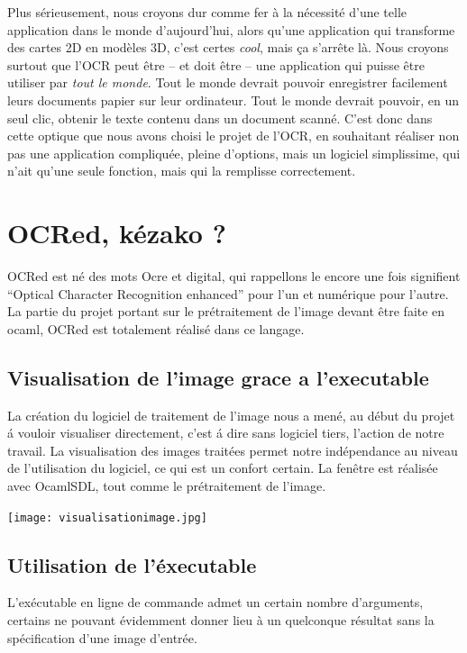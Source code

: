 \documentclass[a4paper,12pt]{report}
\begin{document}
Plus sérieusement, nous croyons dur comme fer à la nécessité d’une telle application dans le monde d’aujourd’hui, alors qu’une application qui transforme des cartes 2D en modèles 3D, c’est certes \emph{cool}, mais ça s’arrête là. Nous croyons surtout que l’OCR peut être – et doit être – une application qui puisse être utiliser par \emph{tout le monde}. Tout le monde devrait pouvoir enregistrer facilement leurs documents papier sur leur ordinateur. Tout le monde devrait pouvoir, en un seul clic, obtenir le texte contenu dans un document scanné. C’est donc dans cette optique que nous avons choisi le projet de l’OCR, en souhaitant réaliser non pas une application compliquée, pleine d’options, mais un logiciel simplissime, qui n’ait qu’une seule fonction, mais qui la remplisse correctement.

\chapter{ OCRed, k\'ezako ? }
 OCRed est n\'e des mots Ocre et digital, qui rappellons le encore une fois
 signifient ``Optical Character Recognition enhanced'' pour l'un et
 num\'erique pour l'autre. La partie du projet portant sur le
 pr\'etraitement de l'image devant \^etre faite en ocaml, OCRed est
 totalement r\'ealis\'e dans ce langage.

\section{ Visualisation de l'image grace a l'executable }
 La cr\'eation du logiciel de traitement de l'image nous a men\'e, au
 d\'ebut du projet \'a vouloir visualiser directement, c'est \'a dire
 sans logiciel tiers, l'action de notre travail.
 La visualisation des images trait\'ees permet notre ind\'ependance
 au niveau de l'utilisation du logiciel, ce qui est un confort certain.
 La fen\^etre est r\'ealis\'ee avec OcamlSDL, tout comme le pr\'etraitement
 de l'image.

\begin{center}
	
	\texttt{[image: visualisationimage.jpg]}\\
\end{center}

\section{ Utilisation de l'\'executable }
 L'ex\'ecutable en ligne de commande admet un certain nombre d'arguments,
 certains ne pouvant \'evidemment donner lieu \`a un quelconque r\'esultat
 sans la sp\'ecification d'une image d'entr\'ee.
\end{document}
